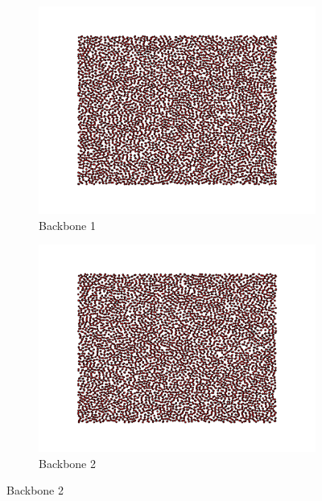 \documentclass[oneside, titlepage]{scrartcl}
\begin{document}
\begin{figure}[!h]
\begin{subfigure}{0.5\textwidth}
	\centering
	\includegraphics[width=0.9\linewidth]{figures/simplegraph5.pdf}
	\caption{Backbone 1}
\end{subfigure}%
\begin{subfigure}{0.5\textwidth}
	\centering
	\includegraphics[width=0.9\linewidth]{figures/simplegraph51.pdf}
	\caption{Backbone 2}
\end{subfigure}
\end{figure}
\end{document}
